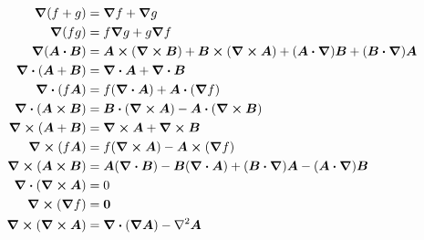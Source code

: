 \documentclass[uplatex,dvipdfmx,a4paper,11pt]{jlreq}
\newcommand{\rot}{\curl}
\theoremstyle{definition}
\begin{document}
\begin{theorem}
  \begin{align}
    \grad{(f+g)}               & = \grad{f} + \grad{g}                                                                                               \\
    \grad{(fg)}                & = f\grad{g} + g\grad{f}                                                                                             \\
    \grad{(\bm{A}\vdot\bm{B})} & = \bm{A}\cross(\rot{\bm{B}}) + \bm{B}\cross(\rot{\bm{A}}) + (\bm{A}\vdot\vnabla)\bm{B} + (\bm{B}\vdot\vnabla)\bm{A} \\
    \div{(\bm{A}+\bm{B})}      & = \div{\bm{A}} + \div{\bm{B}}                                                                                       \\
    \div{(f\bm{A})}            & = f(\div{\bm{A}}) + \bm{A}\vdot(\grad{f})                                                                           \\
    \div{(\bm{A}\cross\bm{B})} & = \bm{B}\vdot(\rot{\bm{A}}) - \bm{A}\vdot(\rot{\bm{B}})                                                             \\
    \rot{(\bm{A}+\bm{B})}      & = \rot{\bm{A}} + \rot{\bm{B}}                                                                                       \\
    \rot{(f\bm{A})}            & = f(\rot{\bm{A}}) - \bm{A}\cross(\grad{f})                                                                          \\
    \rot{(\bm{A}\cross\bm{B})} & = \bm{A}(\div{\bm{B}}) - \bm{B}(\div{\bm{A}}) + (\bm{B}\vdot\vnabla)\bm{A} - (\bm{A}\vdot\vnabla)\bm{B}             \\
    \div{(\rot{\bm{A}})}       & = 0                                                                                                                 \\
    \rot{(\grad{f})}           & = \bm{0}                                                                                                            \\
    \rot{(\rot{\bm{A}})}       & = \div{(\grad{\bm{A}})} - \laplacian{\bm{A}}
  \end{align}
\end{theorem}
\end{document}
